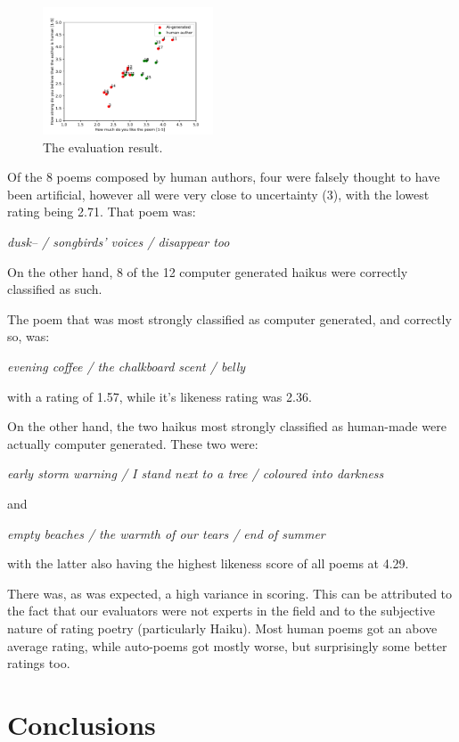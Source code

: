 \documentclass{acm_proc_article-sp}
\begin{document}
\begin{figure}[h!]
	\centering
	\includegraphics[width=0.45\textwidth]{average_score_poems_2.pdf}
    \caption[The evaluation result.]{The evaluation result.}
    \label{fig:results}
\end{figure}

Of the 8 poems composed by human authors, four were falsely thought to have been artificial, however all were very close to uncertainty (3), with the lowest rating being 2.71. That poem was:

\emph{dusk-- / songbirds' voices / disappear too}

On the other hand, 8 of the 12 computer generated haikus were correctly classified as such.

The poem that was most strongly classified as computer generated, and correctly so, was:

\emph{evening coffee / the chalkboard scent / belly}

with a rating of 1.57, while it's likeness rating was 2.36.

On the other hand, the two haikus most strongly classified as human-made were actually
computer generated. These two were:

\emph{early storm warning / I stand next to a tree / coloured into darkness}

and

\emph{empty beaches / the warmth of our tears / end of summer}

with the latter also having the highest likeness score of all poems at 4.29.

There was, as was expected, a high variance in scoring. This can be attributed to the fact that our evaluators were not experts in the field and to the subjective nature of rating poetry (particularly Haiku). \cite{ritchie2001creativity}Most human poems got an above average rating, while auto-poems got mostly worse, but surprisingly some better ratings too.

\section{Conclusions}
\end{document}
